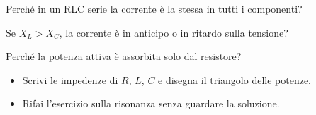 \documentclass[10pt]{article}
\begin{document}
\begin{autoverifica}
\item Perché in un RLC serie la corrente è la stessa in tutti i componenti?
\item Se $X_L > X_C$, la corrente è in anticipo o in ritardo sulla tensione?
\item Perché la potenza attiva è assorbita solo dal resistore?
\end{autoverifica}

\begin{ripasso}
\begin{itemize}
  \item Scrivi le impedenze di $R$, $L$, $C$ e disegna il triangolo delle potenze.
  \item Rifai l'esercizio sulla risonanza senza guardare la soluzione.
\end{itemize}
\end{ripasso}
\end{document}
